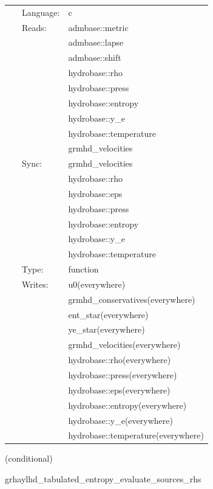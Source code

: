 \documentclass{article}
\begin{document}
 \begin{tabular*}{160mm}{cll} 
~ & Language:  & c \\ 
~ & Reads:  & admbase::metric \\ 
~& ~ &admbase::lapse\\ 
~& ~ &admbase::shift\\ 
~& ~ &hydrobase::rho\\ 
~& ~ &hydrobase::press\\ 
~& ~ &hydrobase::entropy\\ 
~& ~ &hydrobase::y\_e\\ 
~& ~ &hydrobase::temperature\\ 
~& ~ &grmhd\_velocities\\ 
~ & Sync:  & grmhd\_velocities \\ 
~& ~ &hydrobase::rho\\ 
~& ~ &hydrobase::eps\\ 
~& ~ &hydrobase::press\\ 
~& ~ &hydrobase::entropy\\ 
~& ~ &hydrobase::y\_e\\ 
~& ~ &hydrobase::temperature\\ 
~ & Type:  & function \\ 
~ & Writes:  & u0(everywhere) \\ 
~& ~ &grmhd\_conservatives(everywhere)\\ 
~& ~ &ent\_star(everywhere)\\ 
~& ~ &ye\_star(everywhere)\\ 
~& ~ &grmhd\_velocities(everywhere)\\ 
~& ~ &hydrobase::rho(everywhere)\\ 
~& ~ &hydrobase::press(everywhere)\\ 
~& ~ &hydrobase::eps(everywhere)\\ 
~& ~ &hydrobase::entropy(everywhere)\\ 
~& ~ &hydrobase::y\_e(everywhere)\\ 
~& ~ &hydrobase::temperature(everywhere)\\ 
\end{tabular*} 


\vspace{5mm}

   (conditional) 

\hspace{5mm} grhaylhd\_tabulated\_entropy\_evaluate\_sources\_rhs 

\hspace{5mm}{\it entropy+tabulated version of grhaylhd\_evaluate\_sources\_rhs } 
\end{document}
